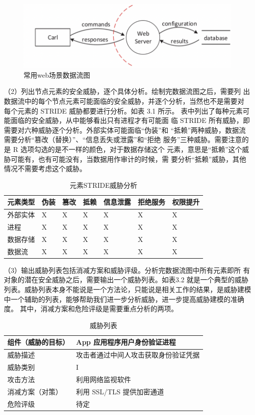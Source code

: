 \begin{figure}
    \centering
    \includegraphics[scale=0.6]{resources/img/i7.png}
    \caption{常用web场景数据流图}
  \end{figure}
  （2）列出节点元素的安全威胁，逐个具体分析。绘制完数据流图之后，需要列
  出数据流中的每个节点元素可能面临的安全威胁，并逐个分析，当然也不是需要对
  每个元素的 STRIDE 威胁都要进行分析。如表 3.1 所示。
  表中列出了每种元素可能面临的安全威胁，从中能够看出只有进程才有可能面
  临 STRIDE 所有威胁，即需要对六种威胁逐个分析。外部实体可能面临“伪装”和
  “抵赖”两种威胁，数据流需要分析“篡改（替换）”、“信息丢失或泄露”和“拒绝
  服务”三种威胁。需要注意的是 R 选项勾选的是不一样的颜色，对于数据存储这个
  元素，意思是“抵赖”这个威胁可能有，也有可能没有，当数据用作审计的时候，需
  要分析“抵赖”威胁，其他情况不需要考虑这个威胁。
  \begin{table}
    \caption{元素STRIDE威胁分析}
  \begin{center}
    \begin{tabular}{|l|l|l|l|l|l|l}
      \hline 元素类型 & 伪装 & 篡改 & 抵赖 & 信息泄露 & 拒绝服务 & 权限提升\\
      \hline 外部实体 & X & X & X & X & X & X \\
      \hline 进程 & X & X & X & X & X & X \\
      \hline 数据存储 & X & X & X & X & X & X \\
      \hline 数据流 & X & X & X & X & X & X \\
      \hline
      \end{tabular}
  \end{center}
\end{table}
  （3）输出威胁列表包括消减方案和威胁评级。分析完数据流图中所有元素即所
有对象的潜在安全威胁之后，需要输出一个威胁列表。如表3.2 就是一个典型的威胁
列表。威胁列表本身不能说是一个方法论，只能说是相关工作的结果，是威胁建模
中一个辅助的列表，能够帮助我们进一步分析威胁，进一步提高威胁建模的准确度。
其中，消减方案和危险评级是需要重点分析的两项。
\begin{table}
  \caption{威胁列表}
\begin{center}
  \begin{tabular}{|l|l|}
    \hline 组件（威胁的目标） & App 应用程序用户身份验证进程 \\
    \hline 威胁描述 & 攻击者通过中间人攻击获取身份验证凭据 \\
    \hline 威胁类别 & I \\
    \hline 攻击方法 & 利用网络监视软件 \\
    \hline 消减方案（对策） & 利用 SSL/TLS 提供加密通道 \\
    \hline 危险评级 & 待定 \\
    \hline
    \end{tabular}
\end{center}
\end{table}
